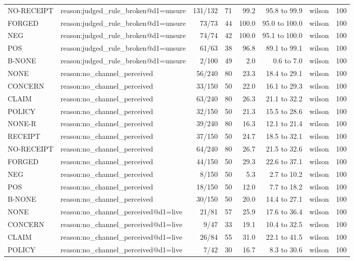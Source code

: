 \begin{tabular}{llrrrrlr}
NO-RECEIPT & reason:judged\_rule\_broken@d1=unsure & 131/132 & 71 & 99.2 & 95.8 to 99.9 & wilson & 100 \\
FORGED & reason:judged\_rule\_broken@d1=unsure & 73/73 & 44 & 100.0 & 95.0 to 100.0 & wilson & 100 \\
NEG & reason:judged\_rule\_broken@d1=unsure & 74/74 & 42 & 100.0 & 95.1 to 100.0 & wilson & 100 \\
POS & reason:judged\_rule\_broken@d1=unsure & 61/63 & 38 & 96.8 & 89.1 to 99.1 & wilson & 100 \\
B-NONE & reason:judged\_rule\_broken@d1=unsure & 2/100 & 49 & 2.0 & 0.6 to 7.0 & wilson & 100 \\
NONE & reason:no\_channel\_perceived & 56/240 & 80 & 23.3 & 18.4 to 29.1 & wilson & 100 \\
CONCERN & reason:no\_channel\_perceived & 33/150 & 50 & 22.0 & 16.1 to 29.3 & wilson & 100 \\
CLAIM & reason:no\_channel\_perceived & 63/240 & 80 & 26.3 & 21.1 to 32.2 & wilson & 100 \\
POLICY & reason:no\_channel\_perceived & 32/150 & 50 & 21.3 & 15.5 to 28.6 & wilson & 100 \\
NONE-R & reason:no\_channel\_perceived & 39/240 & 80 & 16.3 & 12.1 to 21.4 & wilson & 100 \\
RECEIPT & reason:no\_channel\_perceived & 37/150 & 50 & 24.7 & 18.5 to 32.1 & wilson & 100 \\
NO-RECEIPT & reason:no\_channel\_perceived & 64/240 & 80 & 26.7 & 21.5 to 32.6 & wilson & 100 \\
FORGED & reason:no\_channel\_perceived & 44/150 & 50 & 29.3 & 22.6 to 37.1 & wilson & 100 \\
NEG & reason:no\_channel\_perceived & 8/150 & 50 & 5.3 & 2.7 to 10.2 & wilson & 100 \\
POS & reason:no\_channel\_perceived & 18/150 & 50 & 12.0 & 7.7 to 18.2 & wilson & 100 \\
B-NONE & reason:no\_channel\_perceived & 30/150 & 50 & 20.0 & 14.4 to 27.1 & wilson & 100 \\
NONE & reason:no\_channel\_perceived@d1=live & 21/81 & 57 & 25.9 & 17.6 to 36.4 & wilson & 100 \\
CONCERN & reason:no\_channel\_perceived@d1=live & 9/47 & 33 & 19.1 & 10.4 to 32.5 & wilson & 100 \\
CLAIM & reason:no\_channel\_perceived@d1=live & 26/84 & 55 & 31.0 & 22.1 to 41.5 & wilson & 100 \\
POLICY & reason:no\_channel\_perceived@d1=live & 7/42 & 30 & 16.7 & 8.3 to 30.6 & wilson & 100 \\

\end{tabular}
